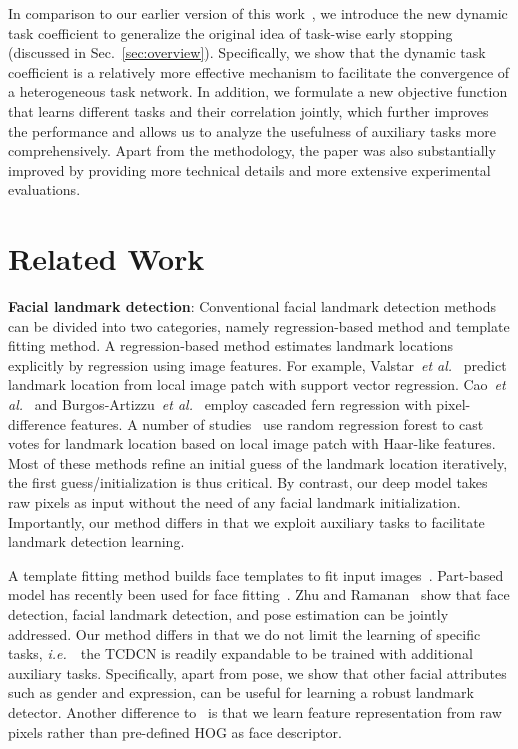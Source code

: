 \documentclass[10pt,journal,compsoc]{IEEEtran}
\newcommand{\etal}{\emph{et al.}}
\newcommand{\ie}{\emph{i.e.}~}
\begin{document}
In comparison to our earlier version of this work~\cite{zhang2014facial}, we introduce the new dynamic task coefficient to generalize the original idea of task-wise early stopping~\cite{zhang2014facial} (discussed in Sec.~\ref{sec:overview}). Specifically, we show that the dynamic task coefficient is a relatively more effective mechanism to facilitate the convergence of a heterogeneous task network.
In addition, we formulate a new objective function that learns different tasks and their correlation jointly, which further improves the performance and allows us to analyze the usefulness of auxiliary tasks more comprehensively.
Apart from the methodology, the paper was also substantially improved by providing more technical details and more extensive experimental evaluations.


\section{Related Work}
\label{sec:related_work}

\noindent \textbf{Facial landmark detection}:
Conventional facial landmark detection methods can be divided into two categories, namely regression-based method and template fitting method. A regression-based method estimates landmark locations explicitly by regression using image features. For example, Valstar~\etal~\cite{Valstar2010} predict landmark location from local image patch with support vector regression. Cao~\etal~\cite{Cao2012} and Burgos-Artizzu~\etal~\cite{dollar13}  employ cascaded fern regression with pixel-difference features. A number of studies~\cite{dollar2010cascaded,Cootes2012,Dantone2012,yang2013sieving,300w_lbp,chen2014joint} use random regression forest to cast votes for landmark location based on local image patch with Haar-like features. Most of these methods refine an initial guess of the landmark location iteratively, the first guess/initialization is thus critical. By contrast, our deep model takes raw pixels as input without the need of any facial landmark initialization. Importantly, our method differs in that we exploit auxiliary tasks to facilitate landmark detection learning.

A template fitting method builds face templates to fit input images~\cite{Cootes2001,Liu2007,pedersoli2014using}. Part-based model has recently been used for face fitting~\cite{asthana2013robust,Yu2013,Zhu2012}. Zhu and Ramanan~\cite{Zhu2012} show that face detection, facial landmark detection, and pose estimation can be jointly addressed. Our method differs in that we do not limit the learning of specific tasks, \ie~the TCDCN is readily expandable to be trained with additional auxiliary tasks. Specifically, apart from pose, we show that other facial attributes such as gender and expression, can be useful for learning a robust landmark detector. Another difference to~\cite{Zhu2012} is that we learn feature representation from raw pixels rather than pre-defined HOG as face descriptor.
\end{document}
